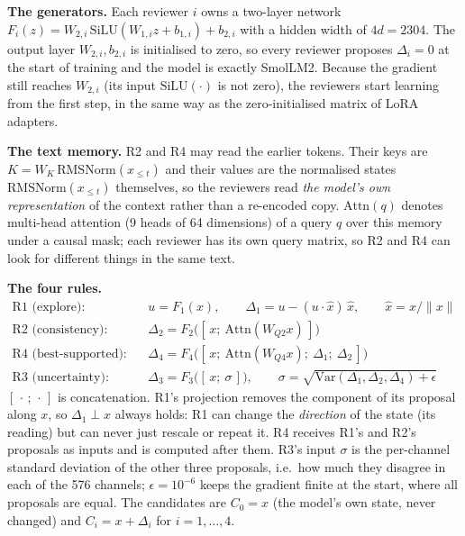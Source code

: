\documentclass[a4paper,12pt,parskip=half,headsepline]{scrartcl}
\begin{document}
\begin{tech}
\textbf{The generators.} Each reviewer $i$ owns a two-layer network
$F_i(z) = W_{2,i}\,\text{SiLU}(W_{1,i} z + b_{1,i}) + b_{2,i}$ with a hidden width of
$4d = 2304$. The output layer $W_{2,i}, b_{2,i}$ is initialised to zero, so every reviewer
proposes $\Delta_i = 0$ at the start of training and the model is exactly SmolLM2. Because
the gradient still reaches $W_{2,i}$ (its input $\text{SiLU}(\cdot)$ is not zero), the
reviewers start learning from the first step, in the same way as the zero-initialised
matrix of LoRA adapters.

\textbf{The text memory.} R2 and R4 may read the earlier tokens. Their keys are
$K = W_K\,\text{RMSNorm}(x_{\le t})$ and their values are the normalised states
$\text{RMSNorm}(x_{\le t})$ themselves, so the reviewers read \emph{the model's own
representation} of the context rather than a re-encoded copy. $\text{Attn}(q)$ denotes
multi-head attention (9 heads of 64 dimensions) of a query $q$ over this memory under a
causal mask; each reviewer has its own query matrix, so R2 and R4 can look for different
things in the same text.

\textbf{The four rules.}
\begin{align*}
\text{R1 (explore):}\quad & u = F_1(x),\qquad \Delta_1 = u - (u\cdot\hat x)\,\hat x, \qquad \hat x = x/\lVert x\rVert\\
\text{R2 (consistency):}\quad & \Delta_2 = F_2\big([\,x;\ \text{Attn}(W_{Q2}x)\,]\big)\\
\text{R4 (best-supported):}\quad & \Delta_4 = F_4\big([\,x;\ \text{Attn}(W_{Q4}x);\ \Delta_1;\ \Delta_2\,]\big)\\
\text{R3 (uncertainty):}\quad & \Delta_3 = F_3\big([\,x;\ \sigma\,]\big),\qquad \sigma = \sqrt{\text{Var}(\Delta_1,\Delta_2,\Delta_4) + \epsilon}
\end{align*}
$[\,\cdot\,;\,\cdot\,]$ is concatenation. R1's projection removes the component of its
proposal along $x$, so $\Delta_1 \perp x$ always holds: R1 can change the
\emph{direction} of the state (its reading) but can never just rescale or repeat it. R4
receives R1's and R2's proposals as inputs and is computed after them. R3's input
$\sigma$ is the per-channel standard deviation of the other three proposals, i.e.\ how
much they disagree in each of the 576 channels; $\epsilon = 10^{-6}$ keeps the gradient
finite at the start, where all proposals are equal. The candidates are
$C_0 = x$ (the model's own state, never changed) and $C_i = x + \Delta_i$ for
$i = 1, \dots, 4$.
\end{tech}
\end{document}
